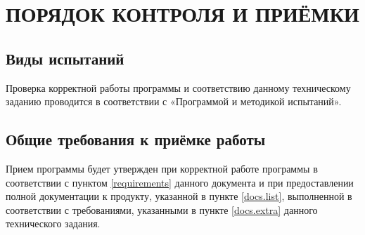 \section{ПОРЯДОК КОНТРОЛЯ И ПРИЁМКИ}

\subsection{Виды испытаний}
Проверка корректной работы программы и соответствию данному техническому заданию проводится в соответствии с «Программой и методикой испытаний».

\subsection{Общие требования к приёмке работы}
    Прием программы будет утвержден при корректной работе программы в соответствии с
    пунктом \ref{requirements} данного документа и при предоставлении полной документации к продукту,
    указанной в пункте \ref{docs.list}, выполненной в соответствии с требованиями, указанными в пункте \ref{docs.extra} данного технического задания.
    
\clearpage
